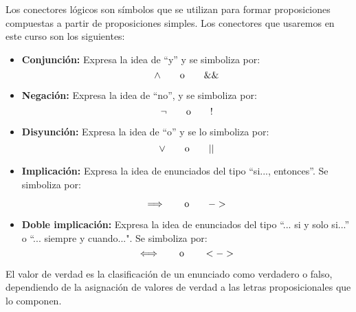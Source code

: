 \documentclass[a4,11pt]{aleph-notas}
\begin{document}
\begin{defi}
     Los conectores lógicos son símbolos que se utilizan para formar proposiciones compuestas a partir de proposiciones simples. Los conectores que usaremos en este curso son los siguientes:
    
    \begin{itemize}[leftmargin=*]
    \item
        \textbf{Conjunción:} Expresa la idea de ``y'' y se simboliza por:
        \[
            \wedge\qquad\text{o}\qquad \&\&
        \]
    \item
        \textbf{Negación:} Expresa la idea de ``no'', y se simboliza por:
        \[
            \neg\qquad\text{o}\qquad !
        \]
    \item
        \textbf{Disyunción:} Expresa la idea de ``o'' y se lo simboliza por:
        \[
            \vee\qquad\text{o}\qquad || 
        \]
    \item
        \textbf{Implicación:} Expresa la idea de enunciados del tipo  ``si..., entonces''. Se simboliza por:

        \[
            \Longrightarrow\qquad\text{o}\qquad ->
        \]
    \item
        \textbf{Doble implicación:} Expresa la idea de enunciados del tipo ``... si y solo si...'' o ``... siempre y cuando...". Se simboliza por:
        \[
            \Longleftrightarrow\qquad\text{o}\qquad <->
        \]
    \end{itemize}
\end{defi}

\begin{defi}
    El valor de verdad es la clasificación de un enunciado como verdadero o falso, dependiendo de la asignación de valores de verdad a las letras proposicionales que lo componen.
\end{defi}
\end{document}

